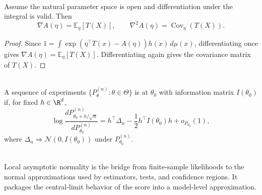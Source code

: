 \begin{proposition} \label{prop:exponential-family-moments} \\
Assume the natural parameter space is open and differentiation under the integral is valid.  Then
\[
\nabla A(\eta)=\mathbb{E}_\eta[T(X)],
\qquad
\nabla^2 A(\eta)=\operatorname{Cov}_\eta(T(X)).
\]
\begin{proof}
Since $1=\int \exp(\eta^\top T(x)-A(\eta))h(x)\,d\mu(x)$, differentiating once gives $\nabla A(\eta)=\mathbb{E}_\eta[T(X)]$.  Differentiating again gives the covariance matrix of $T(X)$.
\end{proof}
\end{proposition}

\begin{definition} \label{def:local-asymptotic-normality} \\
A sequence of experiments $\{P_{\theta}^{(n)}:\theta\in\Theta\}$ is  at $\theta_0$ with information matrix $I(\theta_0)$ if, for fixed $h\in\R^d$,
\[
\log\frac{dP_{\theta_0+h/\sqrt{n}}^{(n)}}{dP_{\theta_0}^{(n)}}
=h^\top\Delta_n-\frac{1}{2}h^\top I(\theta_0)h+o_{P_{\theta_0}}(1),
\]
where $\Delta_n\Rightarrow\mathcal{N}(0,I(\theta_0))$ under $P_{\theta_0}^{(n)}$.
\end{definition}

\begin{remark} \label{rem:lan-bridge-to-estimation-tests} \\
Local asymptotic normality is the bridge from finite-sample likelihoods to the normal approximations used by estimators, tests, and confidence regions.  It packages the central-limit behavior of the score into a model-level approximation.
\end{remark}
